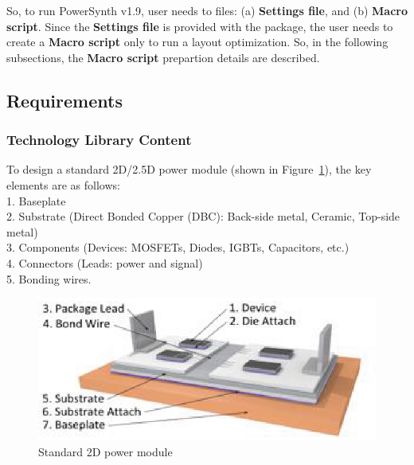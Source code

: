 \documentclass[11pt]{article}
\begin{document}
So, to run PowerSynth v1.9, user needs to files: (a) \textbf{Settings file}, and (b) \textbf{Macro script}. Since the \textbf{Settings file} is provided with the package, the user needs to create a \textbf{Macro script} only to run a layout optimization. So, in the following subsections, the \textbf{Macro script} prepartion details are described.

\subsection{Requirements}
\label{sec-2-2}

\subsubsection{Technology Library Content}
\label{sec-2-2-1}
To design a standard 2D/2.5D power module (shown in Figure~\ref{power_module}), the key elements are as follows:\\
1. Baseplate\\
2. Substrate (Direct Bonded Copper (DBC): Back-side metal, Ceramic, Top-side metal)\\
3. Components (Devices: MOSFETs, Diodes, IGBTs, Capacitors, etc.)\\
4. Connectors (Leads: power and signal)\\
5. Bonding wires.\\

\begin{figure}[t]
\centering
\includegraphics[width=4 in, height=2 in]{figs/v_1.9_figs/module_struct.eps}
\caption{Standard 2D power module}
\label{power_module}
\end{figure}
\end{document}
